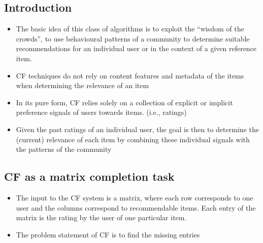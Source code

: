 \documentclass{article}
\begin{document}
\subsection{Introduction}
\begin{itemize}
    \item The basic idea of this class of algorithms is to exploit the “wisdom of the crowds”, to use behavioural patterns of a community to determine suitable recommendations for an individual user or in the context of a given reference item.
    
    \item CF techniques do not rely on content features and metadata of the items when determining the relevance of an item
    
    \item In its pure form, CF relies solely on a collection of explicit or implicit preference signals of users towards items. (i.e., ratings)
    
    \item Given the past ratings of an individual user, the goal is then to determine the (current) relevance of each item by combining these individual signals with the patterns of the community
\end{itemize}

\subsection{CF as a matrix completion task}
\begin{itemize}
    \item The input to the CF system is a matrix, where each row corresponds to one user and the columns correspond to recommendable items. Each entry of the matrix is the rating by the user of one particular item.
    
    \item The problem statement of CF is to find the missing entries 
\end{itemize}
\end{document}

